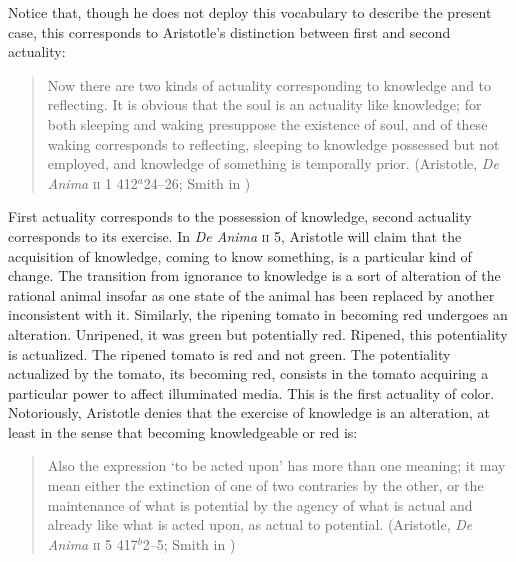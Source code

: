 Notice that, though he does not deploy this vocabulary to describe the present case, this corresponds to Aristotle's distinction between first and second actuality:
\begin{quote}
	Now there are two kinds of actuality corresponding to knowledge and to reflecting. It is obvious that the soul is an actuality like knowledge; for both sleeping and waking presuppose the existence of soul, and of these waking corresponds to reflecting, sleeping to knowledge possessed but not employed, and knowledge of something is temporally prior. (Aristotle, \emph{De Anima} \textsc{ii} 1 412\( ^{a} \)24--26; Smith in \citealt[21]{Barnes:1984uq})
\end{quote}
First actuality corresponds to the possession of knowledge, second actuality corresponds to its exercise. In \emph{De Anima} \textsc{ii} 5, Aristotle will claim that the acquisition of knowledge, coming to know something, is a particular kind of change. The transition from ignorance to knowledge is a sort of alteration of the rational animal insofar as one state of the animal has been replaced by another inconsistent with it. Similarly, the ripening tomato in becoming red undergoes an alteration. Unripened, it was green but potentially red. Ripened, this potentiality is actualized. The ripened tomato is red and not green. The potentiality actualized by the tomato, its becoming red, consists in the tomato acquiring a particular power to affect illuminated media. This is the first actuality of color. Notoriously, Aristotle denies that the exercise of knowledge is an alteration, at least in the sense that becoming knowledgeable or red is:
\begin{quote}
	 Also the expression ‘to be acted upon’ has more than one meaning; it may mean either the extinction of one of two contraries by the other, or the maintenance of what is potential by the agency of what is actual and already like what is acted upon, as actual to potential. (Aristotle, \emph{De Anima} \textsc{ii} 5 417\( ^{b} \)2--5; Smith in \citealt[30]{Barnes:1984uq})
\end{quote}
